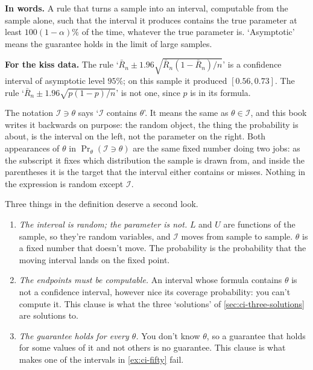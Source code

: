 \begin{inwords}
\textbf{In words.} A rule that turns a sample into an interval, computable from the sample alone, such that the interval it produces contains the true parameter at least $100(1 - \alpha)\%$ of the time, whatever the true parameter is. `Asymptotic' means the guarantee holds in the limit of large samples.
\par\smallskip
\textbf{For the kiss data.} The rule `$\bar{R}_n \pm 1.96\sqrt{\bar{R}_n(1 - \bar{R}_n)/n}$' is a confidence interval of asymptotic level $95\%$; on this sample it produced $[0.56, 0.73]$. The rule `$\bar{R}_n \pm 1.96\sqrt{p(1-p)/n}$' is not one, since $p$ is in its formula.
\end{inwords}

The notation $\mathcal{I} \ni \theta$ says `$\mathcal{I}$ contains $\theta$'.
It means the same as $\theta \in \mathcal{I}$, and this book writes it backwards on purpose: the random object, the thing the probability is about, is the interval on the left, not the parameter on the right.
Both appearances of $\theta$ in $\Pr_\theta(\mathcal{I} \ni \theta)$ are the same fixed number doing two jobs: as the subscript it fixes which distribution the sample is drawn from, and inside the parentheses it is the target that the interval either contains or misses.
Nothing in the expression is random except $\mathcal{I}$.

Three things in the definition deserve a second look.

\begin{enumerate}[nosep]
\item \textit{The interval is random; the parameter is not.} $L$ and $U$ are functions of the sample, so they're random variables, and $\mathcal{I}$ moves from sample to sample. $\theta$ is a fixed number that doesn't move. The probability is the probability that the moving interval lands on the fixed point.
\item \textit{The endpoints must be computable.} An interval whose formula contains $\theta$ is not a confidence interval, however nice its coverage probability: you can't compute it. This clause is what the three `solutions' of \cref{sec:ci-three-solutions} are solutions to.
\item \textit{The guarantee holds for every $\theta$.} You don't know $\theta$, so a guarantee that holds for some values of it and not others is no guarantee. This clause is what makes one of the intervals in \cref{ex:ci-fifty} fail.
\end{enumerate}

